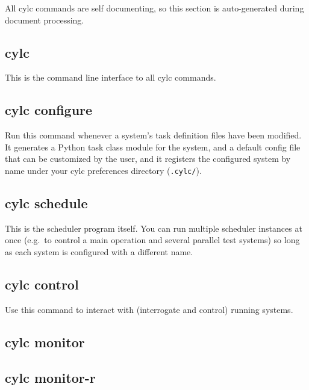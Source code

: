 \documentclass[11pt,a4paper]{article}
\begin{document}
All cylc commands are self documenting, so this section is
auto-generated during document processing.

\subsection{cylc}

\lstset{language=usage}

This is the command line interface to all cylc commands.

{

}

\pagebreak
\subsection{cylc configure}

Run this command whenever a system's task definition files have been
modified. It generates a Python task class module for the system, and a
default config file that can be customized by the user, and it registers
the configured system by name under your cylc preferences directory
(\lstinline=.cylc/=).

{ 
 
}

\pagebreak
\subsection{cylc schedule}

This is the scheduler program itself. You can run multiple scheduler
instances at once (e.g.\ to control a main operation and several
parallel test systems) so long as each system is configured with a
different name. 
{

}

\pagebreak
\subsection{cylc control}

Use this command to interact with (interrogate and control) running systems.

{

}

\pagebreak
\subsection{cylc monitor}
{

}

\subsection{cylc monitor-r}
{

}
\end{document}
